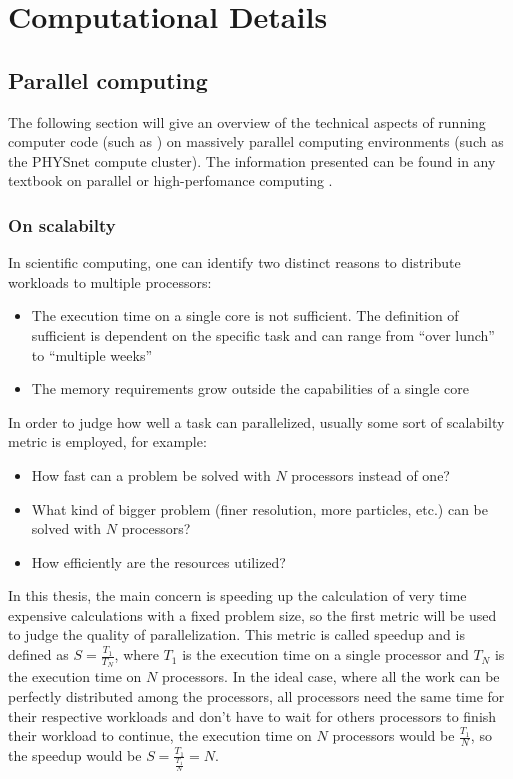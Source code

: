 \documentclass[main.tex]{subfiles}
\begin{document}
\chapter{Computational Details\label{ch:computation}}

\section{Parallel computing\label{sec:parallel_computing}}

The following section will give an overview of the technical aspects of running computer code (such as \QE) on massively parallel computing environments (such as the PHYSnet compute cluster).
The information presented can be found in any textbook on parallel or high-perfomance computing \cite{hager_introduction_2010}.

\subsection{On scalabilty}\label{sub:scalability_general}

In scientific computing, one can identify two distinct reasons to distribute workloads to multiple processors:
\begin{itemize}
    \item The execution time on a single core is not sufficient. The definition of sufficient is dependent on the specific task and can range from \enquote{over lunch} to \enquote{multiple weeks}
    \item The memory requirements grow outside the capabilities of a single core
\end{itemize}

In order to judge how well a task can parallelized, usually some sort of scalabilty metric is employed, for example:
\begin{itemize}
    \item How fast can a problem be solved with \(N\) processors instead of one?
    \item What kind of bigger problem (finer resolution, more particles, etc.) can be solved with \(N\) processors?
    \item How efficiently are the resources utilized?
\end{itemize}
In this thesis, the main concern is speeding up the calculation of very time expensive calculations with a fixed problem size, so the first metric will be used to judge the quality of parallelization.
This metric is called speedup and is defined as \(S = \frac{T_1}{T_N}\), where \(T_1\) is the execution time on a single processor and \(T_N\) is the execution time on \(N\) processors.
In the ideal case, where all the work can be perfectly distributed among the processors, all processors need the same time for their respective workloads and don't have to wait for others processors to finish their workload to continue, the execution time on \(N\) processors would be \(\frac{T_1}{N}\), so the speedup would be \(S = \frac{T_1}{\frac{T_1}{N}} = N\).
\end{document}
